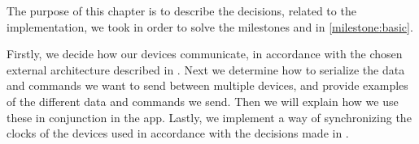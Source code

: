 The purpose of this chapter is to describe the decisions, related to the implementation, 
we took in order to solve the milestones  and  in \cref{milestone:basic}.

Firstly, we decide how our devices communicate, in accordance with the chosen external architecture described in .
Next we determine how to serialize the data and commands we want to send between multiple devices, and provide examples of the different data and commands we send.
Then we will explain how we use these in conjunction in the app. 
Lastly, we implement a way of synchronizing the clocks of the devices used in accordance with the decisions made in .
